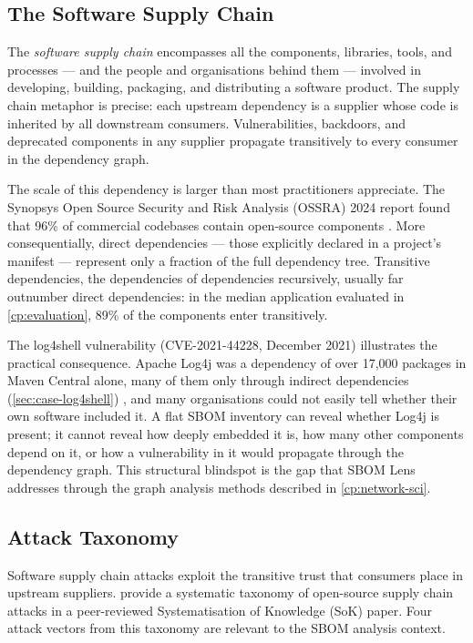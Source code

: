 \subsection{The Software Supply Chain}
\label{sec:software-supply-chain}

The \textit{software supply chain} encompasses all the components, libraries, tools, and processes --- and the people and organisations behind them --- involved in developing, building, packaging, and distributing a software product. The supply chain metaphor is precise: each upstream dependency is a supplier whose code is inherited by all downstream consumers. Vulnerabilities, backdoors, and deprecated components in any supplier propagate transitively to every consumer in the dependency graph.

The scale of this dependency is larger than most practitioners appreciate. The Synopsys Open Source Security and Risk Analysis (OSSRA) 2024 report found that 96\% of commercial codebases contain open-source components \citep{Synopsys2024OSSRA}. More consequentially, direct dependencies --- those explicitly declared in a project's manifest --- represent only a fraction of the full dependency tree. Transitive dependencies, the dependencies of dependencies recursively, usually far outnumber direct dependencies: in the median application evaluated in \autoref{cp:evaluation}, 89\% of the components enter transitively.

The log4shell vulnerability (CVE-2021-44228, December 2021) illustrates the practical consequence. Apache Log4j was a dependency of over 17{,}000 packages in Maven Central alone, many of them only through indirect dependencies (\autoref{sec:case-log4shell}) \citep{GoogleLog4j2021}, and many organisations could not easily tell whether their own software included it. A flat SBOM inventory can reveal whether Log4j is present; it cannot reveal how deeply embedded it is, how many other components depend on it, or how a vulnerability in it would propagate through the dependency graph. This structural blindspot is the gap that SBOM Lens addresses through the graph analysis methods described in \autoref{cp:network-sci}.


\subsection{Attack Taxonomy}
\label{sec:attack-taxonomy}

Software supply chain attacks exploit the transitive trust that consumers place in upstream suppliers. \citet{Ladisa2023} provide a systematic taxonomy of open-source supply chain attacks in a peer-reviewed Systematisation of Knowledge (SoK) paper. Four attack vectors from this taxonomy are relevant to the SBOM analysis context.

